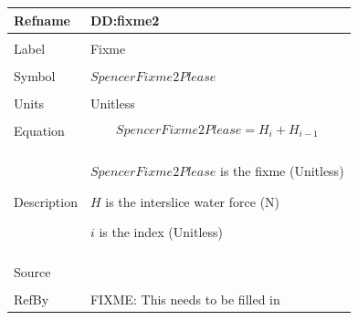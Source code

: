 \documentclass[12pt]{article}
\begin{document}
\noindent \begin{minipage}{\textwidth}
\begin{tabular}{p{} p{}}
\toprule \textbf{Refname} & \textbf{DD:fixme2}
\label{DD:fixme2}
\\ \midrule \\
Label & Fixme
\\ \midrule \\
Symbol & $SpencerFixme2Please$
\\ \midrule \\
Units & Unitless
\\ \midrule \\
Equation & \begin{dmath}
           SpencerFixme2Please=H_{i}+H_{i-1}
           \end{dmath}
\\ \midrule \\
Description & \begin{symbDescription}
              \item{$SpencerFixme2Please$ is the fixme (Unitless)}
              \item{$H$ is the interslice water force (N)}
              \item{$i$ is the index (Unitless)}
              \end{symbDescription}
\\ \midrule \\
Source & 
\\ \midrule \\
RefBy & FIXME: This needs to be filled in
\\ \bottomrule \end{tabular}
\end{minipage}\\
\end{document}
